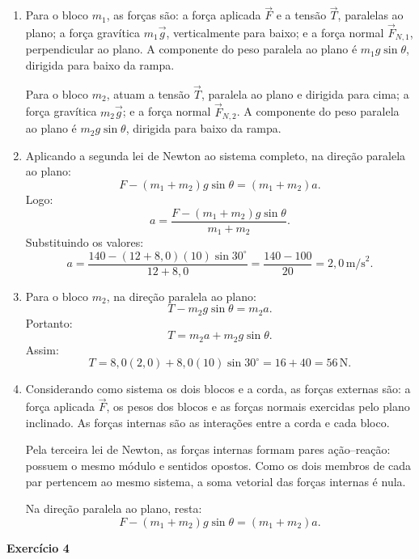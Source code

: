 \documentclass[12pt]{article}
\begin{document}
\begin{enumerate}[label=\textbf{\alph*)}]
    \item Para o bloco $m_1$, as forças são: a força aplicada $\vec{F}$ e a tensão
    $\vec{T}$, paralelas ao plano; a força gravítica $m_1\vec{g}$, verticalmente para
    baixo; e a força normal $\vec{F}_{N,1}$, perpendicular ao plano. A componente do
    peso paralela ao plano é $m_1g\sin\theta$, dirigida para baixo da rampa.

    Para o bloco $m_2$, atuam a tensão $\vec{T}$, paralela ao plano e dirigida para
    cima; a força gravítica $m_2\vec{g}$; e a força normal $\vec{F}_{N,2}$. A componente
    do peso paralela ao plano é $m_2g\sin\theta$, dirigida para baixo da rampa.

    \item Aplicando a segunda lei de Newton ao sistema completo, na direção paralela
    ao plano:
    \[
    F-(m_1+m_2)g\sin\theta=(m_1+m_2)a.
    \]
    Logo:
    \[
    a=
    \frac{F-(m_1+m_2)g\sin\theta}{m_1+m_2}.
    \]
    Substituindo os valores:
    \[
    a=
    \frac{140-(12+8,0)(10)\sin30^\circ}{12+8,0}
    =
    \frac{140-100}{20}
    =2,0\,\text{m/s}^2.
    \]

    \item Para o bloco $m_2$, na direção paralela ao plano:
    \[
    T-m_2g\sin\theta=m_2a.
    \]
    Portanto:
    \[
    T=m_2a+m_2g\sin\theta.
    \]
    Assim:
    \[
    T=8,0(2,0)+8,0(10)\sin30^\circ
    =16+40
    =56\,\text{N}.
    \]

    \item Considerando como sistema os dois blocos e a corda, as forças externas são:
    a força aplicada $\vec{F}$, os pesos dos blocos e as forças normais exercidas pelo
    plano inclinado. As forças internas são as interações entre a corda e cada bloco.

    Pela terceira lei de Newton, as forças internas formam pares ação--reação:
    possuem o mesmo módulo e sentidos opostos. Como os dois membros de cada par
    pertencem ao mesmo sistema, a soma vetorial das forças internas é nula.

    Na direção paralela ao plano, resta:
    \[
    F-(m_1+m_2)g\sin\theta=(m_1+m_2)a.
    \]
\end{enumerate}

\vspace{0.2cm}

\textbf{Exercício 4}
\end{document}
